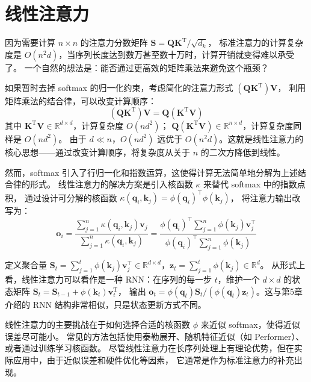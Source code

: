 \section{线性注意力}
因为需要计算 $n \times n$ 的注意力分数矩阵 $\boldsymbol{S} = \boldsymbol{Q} \boldsymbol{K}^\mathrm{T} / \sqrt{d_k}$，
标准注意力的计算复杂度是 $O(n^2d)$，当序列长度达到数万甚至数十万时，计算开销就变得难以承受了。
一个自然的想法是：能否通过更高效的矩阵乘法来避免这个瓶颈？

如果暂时去掉 softmax 的归一化约束，考虑简化的注意力形式 $(\boldsymbol{Q}\boldsymbol{K}^\mathrm{T})\boldsymbol{V}$，
利用矩阵乘法的结合律，可以改变计算顺序：
$$
	(\boldsymbol{Q}\boldsymbol{K}^\mathrm{T})\boldsymbol{V} = \boldsymbol{Q}(\boldsymbol{K}^\mathrm{T}\boldsymbol{V})
$$
其中 $\boldsymbol{K}^\mathrm{T}\boldsymbol{V} \in \mathbb{R}^{d \times d}$，计算复杂度 $O(nd^2)$；
$\boldsymbol{Q}(\boldsymbol{K}^\mathrm{T}\boldsymbol{V}) \in \mathbb{R}^{n \times d}$，计算复杂度同样是 $O(nd^2)$。
由于 $d \ll n$，$O(nd^2)$ 远优于 $O(n^2 d)$。这就是线性注意力的核心思想——通过改变计算顺序，将复杂度从关于 $n$ 的二次方降低到线性。

然而，softmax 引入了行归一化和指数运算，这使得计算无法简单地分解为上述结合律的形式。
线性注意力的解决方案是引入核函数 $\kappa$ 来替代 softmax 中的指数点积，
通过设计可分解的核函数 $\kappa(\boldsymbol{q}_i, \boldsymbol{k}_j) = \phi(\boldsymbol{q}_i)^\top \phi(\boldsymbol{k}_j)$，
将注意力输出改写为：
$$
	\boldsymbol{o}_i = \frac{\sum_{j=1}^n \kappa(\boldsymbol{q}_i, \boldsymbol{k}_j)\boldsymbol{v}_j}{\sum_{j=1}^n \kappa(\boldsymbol{q}_i, \boldsymbol{k}_j)}
	= \frac{\phi(\boldsymbol{q}_i)^\top \sum_{j=1}^n \phi(\boldsymbol{k}_j)\boldsymbol{v}_j^\top}{\phi(\boldsymbol{q}_i)^\top \sum_{j=1}^n \phi(\boldsymbol{k}_j)}
$$

定义聚合量 $\boldsymbol{S}_t = \sum_{j=1}^t \phi(\boldsymbol{k}_j)\boldsymbol{v}_j^\top \in \mathbb{R}^{d \times d}$，$\boldsymbol{z}_t = \sum_{j=1}^t \phi(\boldsymbol{k}_j) \in \mathbb{R}^d$。
从形式上看，线性注意力可以看作是一种 RNN：在序列的每一步 $t$，维护一个 $d \times d$ 的状态矩阵 $\boldsymbol{S}_t = \boldsymbol{S}_{t-1} + \phi(\boldsymbol{k}_t) \boldsymbol{v}_t^\mathrm{T}$，
输出 $\boldsymbol{o}_t = \phi(\boldsymbol{q}_t) \boldsymbol{S}_t / (\phi(\boldsymbol{q}_t) \boldsymbol{z}_t)$。这与第5章介绍的 RNN 结构非常相似，只是状态更新方式不同。

线性注意力的主要挑战在于如何选择合适的核函数 $\phi$ 来近似 softmax，使得近似误差尽可能小。
常见的方法包括使用泰勒展开、随机特征近似（如 Performer）、或者通过训练学习核函数。
尽管线性注意力在长序列处理上有理论优势，但在实际应用中，由于近似误差和硬件优化等因素，
它通常是作为标准注意力的补充出现。
